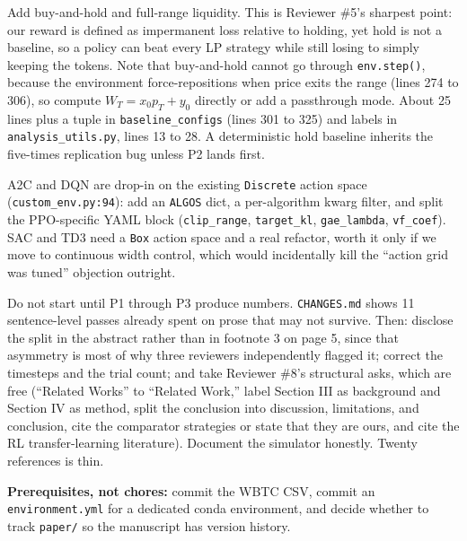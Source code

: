 \documentclass[11pt,a4paper]{article}
\newcommand{\code}[1]{\texttt{\small #1}}
\begin{document}
\begin{description}[leftmargin=2.6em,style=nextline,itemsep=5pt]
\item[P4. Baselines.] Add buy-and-hold and full-range liquidity. This is Reviewer \#5's sharpest
point: our reward is defined as impermanent loss relative to holding, yet hold is not a baseline,
so a policy can beat every LP strategy while still losing to simply keeping the tokens. Note that
buy-and-hold cannot go through \code{env.step()}, because the environment force-repositions when
price exits the range (lines 274 to 306), so compute $W_T = x_0 p_T + y_0$ directly or add a
passthrough mode. About 25 lines plus a tuple in \code{baseline\_configs} (lines 301 to 325) and
labels in \code{analysis\_utils.py}, lines 13 to 28. A deterministic hold baseline inherits the five-times
replication bug unless P2 lands first.

\item[P5. A second learned algorithm.] A2C and DQN are drop-in on the existing \code{Discrete}
action space (\code{custom\_env.py:94}): add an \code{ALGOS} dict, a per-algorithm kwarg filter, and
split the PPO-specific YAML block (\code{clip\_range}, \code{target\_kl}, \code{gae\_lambda},
\code{vf\_coef}). SAC and TD3 need a \code{Box} action space and a real refactor, worth it only if
we move to continuous width control, which would incidentally kill the ``action grid was tuned''
objection outright.

\item[P6. Write-up, last.] Do not start until P1 through P3 produce numbers. \code{CHANGES.md}
shows 11 sentence-level passes already spent on prose that may not survive. Then: disclose the
split in the abstract rather than in footnote 3 on page 5, since that asymmetry is most of why
three reviewers independently flagged it; correct the timesteps and the trial count; and take
Reviewer \#8's structural asks, which are free (``Related Works'' to ``Related Work,'' label
Section III as background and Section IV as method, split the conclusion into discussion,
limitations, and conclusion, cite the comparator strategies or state that they are ours, and cite
the RL transfer-learning literature). Document the simulator honestly. Twenty references is thin.

\end{description}

\noindent \textbf{Prerequisites, not chores:} commit the WBTC CSV, commit an
\code{environment.yml} for a dedicated conda environment, and decide whether to track
\code{paper/} so the manuscript has version history.
\end{document}
